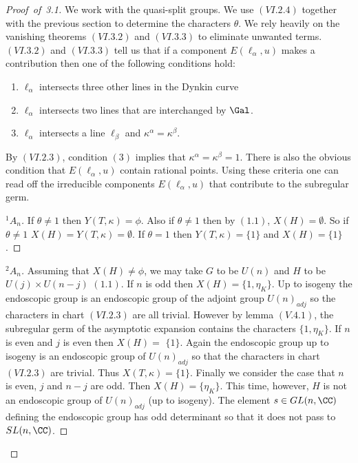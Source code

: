 \documentclass{memo-l}
\theoremstyle{definition}
\theoremstyle{remark}
\numberwithin{section}{chapter}
\numberwithin{equation}{chapter}
\begin{document}
\begin{proof}[Proof\ of\ 3.1] We work with the quasi-split groups.  We use
$(VI.2.4)$ together with the previous section to determine the characters
${\theta}$.  We rely heavily on the vanishing theorems $(VI.3.2)$ and
$(VI.3.3)$ to eliminate unwanted terms.  $(VI.3.2)$ and $(VI.3.3)$ tell us
that if a component $E({\ell}_{{\alpha}},u)$ makes a contribution then one
of the following conditions hold:
\begin{enumerate}[label=\arabic*)]
\item ${\ell}_{{\alpha}}$ intersects three other lines in the Dynkin curve
\item ${\ell}_{{\alpha}}$ intersects two lines that are interchanged by
$\Gal$.
\item ${\ell}_{{\alpha}}$ intersects a line ${\ell}_{{\beta}}$ and
${\kappa}^{{\alpha}} = {\kappa}^{{\beta}}$.
\end{enumerate}

\noindent
By $(VI.2.3)$, condition $(3)$ implies that
${\kappa}^{{\alpha}} = {\kappa}^{{\beta}} = 1$.  There is also the obvious
condition that $E({\ell}_{{\alpha}},u)$ contain rational points.  Using
these criteria one can read off the irreducible components
$E({\ell}_{{\alpha}},u)$ that contribute to the subregular germ.

\begin{proof}[${}^{1}A_{n}$] If ${\theta} \ne 1$ then $Y(T,{\kappa})  =  {\phi}$.  Also if
${\theta} \ne 1$ then by $(1.1)$,  $X(H) = {\emptyset}$.  So if ${\theta} \ne 
1$ $ X(H) = Y(T,{\kappa}) = {\emptyset}$.  If ${\theta} = 1$ then $Y(T,{\kappa}) = \{1\}$ and
$X(H) = \{1\}$.
\phantom\qedhere
\end{proof}


\begin{proof}[${}^{2}A_{n}$]  Assuming that $X(H)  \ne {\phi}$, we may take $G$ to
be $U(n)$ and $H$ to be $U(j) \times U(n-j)$ $(1.1)$.  If $n$ is odd then
$X(H)  =  \{1,{\eta}_{K}\}$.  Up to isogeny the
endoscopic group is an endoscopic group of the adjoint group $U(n)_{adj}$ so
the characters in chart $(VI.2.3)$ are all trivial.  However by lemma
$(V.4.1)$, the subregular germ of the asymptotic expansion contains the
characters $\{1,{\eta}_{K}\}$.  If $n$ is even and $j$ is even then $X(H)
 = $ $\{1\}$.  Again the endoscopic group up to isogeny
is an endoscopic group of $U(n)_{adj}$ so that the characters in chart
$(VI.2.3)$ are trivial.  Thus $X(T,{\kappa})  =  \{1\}$.  Finally we consider
the case that $n$ is even, $j$ and $n-j$ are odd.  Then $X(H)  = 
\{{\eta}_{K}\}$.  This time, however, $H$ is not an endoscopic group of
$U(n)_{adj}$ (up to isogeny).  The element $s  \in 
GL(n,{\CC})$ defining the endoscopic group has odd determinant so that
it does not pass to $SL(n,{\CC})$.


\end{proof}
\end{proof}
\end{document}

